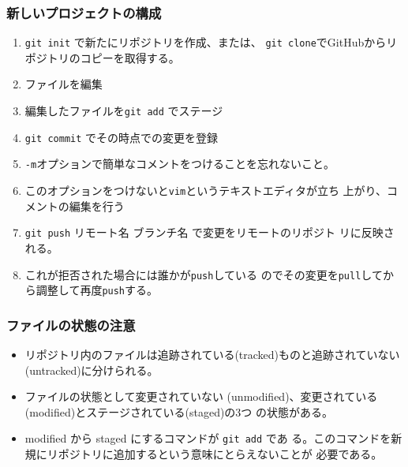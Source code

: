 \begin{frame}[containsverbatim]
 \frametitle{新しいプロジェクトの構成}
\begin{enumerate}
 \item \Verb+git init+ で新たにリポジトリを作成、または、
			 \Verb+git clone+でGitHubからリポジトリのコピーを取得する。
 \item ファイルを編集
 \item 編集したファイルを\Verb+git add+ でステージ
 \item \Verb+git commit+ でその時点での変更を登録
 \item \Verb+-m+オプションで簡単なコメントをつけることを忘れないこと。
 \item このオプションをつけないと\Verb+vim+というテキストエディタが立ち
       上がり、コメントの編集を行う
 \item \Verb+git push+ リモート名 ブランチ名 で変更をリモートのリポジト
			 リに反映される。
 \item これが拒否された場合には誰かが\Verb+push+している
			 のでその変更を\Verb+pull+してから調整して再度\Verb+push+する。
\end{enumerate}
\end{frame}
\begin{frame}[containsverbatim]
 \frametitle{ファイルの状態の注意}
\begin{itemize}
 \item リポジトリ内のファイルは追跡されている(tracked)ものと追跡されていない
(untracked)に分けられる。
 \item ファイルの状態として変更されていない
(unmodified)、変更されている(modified)とステージされている(staged)の3つ
の状態がある。
 \item modified から staged にするコマンドが \Verb+git add+ であ
る。このコマンドを新規にリポジトリに追加するという意味にとらえないことが
必要である。
\end{itemize}
\end{frame}

